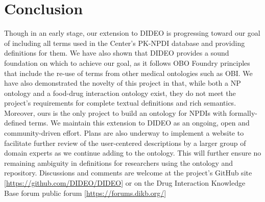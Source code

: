 \documentclass{bmcart}
\begin{document}
\section*{Conclusion}
Though in an early stage, our extension to DIDEO is progressing toward our goal of including all terms used in the Center's PK-NPDI database and providing definitions for them.
We have also shown that DIDEO provides a sound foundation on which to achieve our goal, as it follows OBO Foundry principles that include the re-use of terms from other medical ontologies such as OBI.
We have also demonstrated the novelty of this project in that, while both a NP ontology and a food-drug interaction ontology exist, they do not meet the project's requirements for complete textual definitions and rich semantics.
Moreover, ours is the only project to build an ontology for NPDIs with formally-defined terms.
We maintain this extension to DIDEO as an ongoing, open and community-driven effort.
Plans are also underway to implement a website to facilitate further review of the user-centered descriptions by a larger group of domain experts as we continue adding to the ontology.
This will further ensure no remaining ambiguity in definitions for researchers using the ontology and repository. %
Discussions and comments are welcome at the project's GitHub site [\url{https://github.com/DIDEO/DIDEO}] or on the Drug Interaction Knowledge Base forum public forum [\url{https://forums.dikb.org/}]

\end{document}
